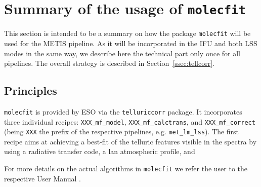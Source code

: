 \section{Summary of the usage of \texttt{molecfit}}\label{app:mf}
This section is intended to be a summary on how the package \texttt{molecfit} will be used for the \ac{METIS} pipeline. As it will be incorporated in the \ac{IFU} and both \ac{LSS} modes in the same way, we describe here the technical part only once for all pipelines. The overall strategy is described in Section~\ref{ssec:tellcorr}.
\subsection{Principles}\label{app:mf_principles}
\texttt{molecfit} is provided by \ac{ESO} via the \texttt{telluriccorr} package. It incorporates three individual recipes: \texttt{XXX_mf_model}, \texttt{XXX_mf_calctrans}, and \texttt{XXX_mf_correct} (being \texttt{XXX} the prefix of the respective pipelines, e.g. \texttt{met_lm_lss}). The first recipe aims at achieving a best-fit of the telluric features visible in the spectra by using a radiative transfer code, a lan atmospheric profile, and 

For more details on the actual algorithms in \texttt{molecfit} we refer the user to the respective User Manual \cite{molecfit}.\\


